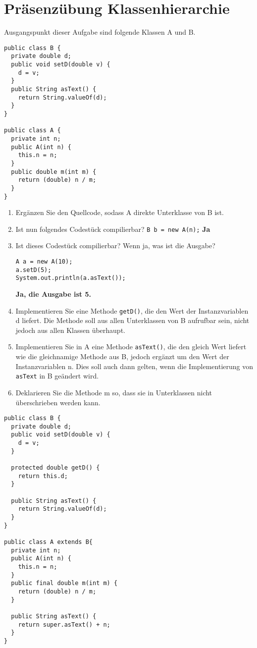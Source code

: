 \chapter{Präsenzübung Klassenhierarchie}

Ausgangspunkt dieser Aufgabe sind folgende Klassen A und B.

\begin{lstlisting}
public class B {
  private double d;
  public void setD(double v) {
    d = v;
  }
  public String asText() {
    return String.valueOf(d);
  }
}

public class A {
  private int n;
  public A(int n) {
    this.n = n;
  }
  public double m(int m) {
    return (double) n / m;
  }
}
\end{lstlisting}

\begin{enumerate}
  \item Ergänzen Sie den Quellcode, sodass A direkte Unterklasse von B ist.
  \item Ist nun folgendes Codestück compilierbar? \lstinline{B b = new A(n);} \newline
        \textbf{Ja}
  \item Ist dieses Codestück compilierbar? Wenn ja, was ist die Ausgabe? \newline
        \begin{lstlisting}
A a = new A(10);
a.setD(5);
System.out.println(a.asText());
\end{lstlisting}
        \textbf{Ja, die Ausgabe ist 5.}
  \item Implementieren Sie eine Methode \lstinline{getD()}, die den Wert der
        Instanzvariablen d liefert. Die Methode soll aus allen Unterklassen von B
        aufrufbar sein, nicht jedoch aus allen Klassen überhaupt.
  \item Implementieren Sie in A eine Methode \lstinline{asText()}, die den gleich Wert
        liefert wie die gleichnamige Methode aus B, jedoch ergänzt um den Wert der
        Instanzvariablen n. Dies soll auch dann gelten, wenn die Implementierung von
        \lstinline{asText} in B geändert wird.
  \item Deklarieren Sie die Methode m so, dass sie in Unterklassen nicht überschrieben
        werden kann.
\end{enumerate}

\begin{lstlisting}
public class B {
  private double d;
  public void setD(double v) {
    d = v;
  }

  protected double getD() {
    return this.d;
  }

  public String asText() {
    return String.valueOf(d);
  }
}

public class A extends B{
  private int n;
  public A(int n) {
    this.n = n;
  }
  public final double m(int m) {
    return (double) n / m;
  }

  public String asText() {
    return super.asText() + n;
  }
}
\end{lstlisting}